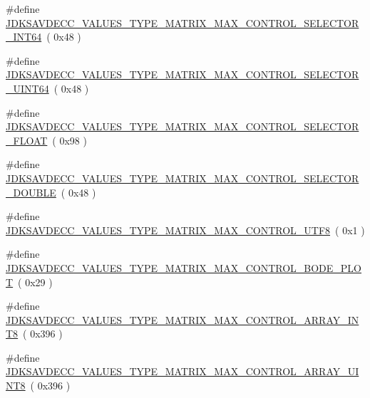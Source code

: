 \begin{DoxyCompactItemize}
\item 
\#define \hyperlink{group__values__type__matrix__max_ga6596fa809de5fad190036f0e50918e94}{J\+D\+K\+S\+A\+V\+D\+E\+C\+C\+\_\+\+V\+A\+L\+U\+E\+S\+\_\+\+T\+Y\+P\+E\+\_\+\+M\+A\+T\+R\+I\+X\+\_\+\+M\+A\+X\+\_\+\+C\+O\+N\+T\+R\+O\+L\+\_\+\+S\+E\+L\+E\+C\+T\+O\+R\+\_\+\+I\+N\+T64}~( 0x48 )
\item 
\#define \hyperlink{group__values__type__matrix__max_ga09d083e7ae4fb6c4ce96a770def60fd6}{J\+D\+K\+S\+A\+V\+D\+E\+C\+C\+\_\+\+V\+A\+L\+U\+E\+S\+\_\+\+T\+Y\+P\+E\+\_\+\+M\+A\+T\+R\+I\+X\+\_\+\+M\+A\+X\+\_\+\+C\+O\+N\+T\+R\+O\+L\+\_\+\+S\+E\+L\+E\+C\+T\+O\+R\+\_\+\+U\+I\+N\+T64}~( 0x48 )
\item 
\#define \hyperlink{group__values__type__matrix__max_ga8b3cf62275e948f85e546523ad140d28}{J\+D\+K\+S\+A\+V\+D\+E\+C\+C\+\_\+\+V\+A\+L\+U\+E\+S\+\_\+\+T\+Y\+P\+E\+\_\+\+M\+A\+T\+R\+I\+X\+\_\+\+M\+A\+X\+\_\+\+C\+O\+N\+T\+R\+O\+L\+\_\+\+S\+E\+L\+E\+C\+T\+O\+R\+\_\+\+F\+L\+O\+AT}~( 0x98 )
\item 
\#define \hyperlink{group__values__type__matrix__max_ga60a17f7db294a757053cca5126346baa}{J\+D\+K\+S\+A\+V\+D\+E\+C\+C\+\_\+\+V\+A\+L\+U\+E\+S\+\_\+\+T\+Y\+P\+E\+\_\+\+M\+A\+T\+R\+I\+X\+\_\+\+M\+A\+X\+\_\+\+C\+O\+N\+T\+R\+O\+L\+\_\+\+S\+E\+L\+E\+C\+T\+O\+R\+\_\+\+D\+O\+U\+B\+LE}~( 0x48 )
\item 
\#define \hyperlink{group__values__type__matrix__max_ga1f8b71e9bead1003c6cfabb3b3886884}{J\+D\+K\+S\+A\+V\+D\+E\+C\+C\+\_\+\+V\+A\+L\+U\+E\+S\+\_\+\+T\+Y\+P\+E\+\_\+\+M\+A\+T\+R\+I\+X\+\_\+\+M\+A\+X\+\_\+\+C\+O\+N\+T\+R\+O\+L\+\_\+\+U\+T\+F8}~( 0x1 )
\item 
\#define \hyperlink{group__values__type__matrix__max_ga99f66da4c2adf4ac92a11eaa89716294}{J\+D\+K\+S\+A\+V\+D\+E\+C\+C\+\_\+\+V\+A\+L\+U\+E\+S\+\_\+\+T\+Y\+P\+E\+\_\+\+M\+A\+T\+R\+I\+X\+\_\+\+M\+A\+X\+\_\+\+C\+O\+N\+T\+R\+O\+L\+\_\+\+B\+O\+D\+E\+\_\+\+P\+L\+OT}~( 0x29 )
\item 
\#define \hyperlink{group__values__type__matrix__max_gabb8ad2ca2c9ee24d58d6e5087d12f752}{J\+D\+K\+S\+A\+V\+D\+E\+C\+C\+\_\+\+V\+A\+L\+U\+E\+S\+\_\+\+T\+Y\+P\+E\+\_\+\+M\+A\+T\+R\+I\+X\+\_\+\+M\+A\+X\+\_\+\+C\+O\+N\+T\+R\+O\+L\+\_\+\+A\+R\+R\+A\+Y\+\_\+\+I\+N\+T8}~( 0x396 )
\item 
\#define \hyperlink{group__values__type__matrix__max_ga9aca1be479633219053be51fe4f087d3}{J\+D\+K\+S\+A\+V\+D\+E\+C\+C\+\_\+\+V\+A\+L\+U\+E\+S\+\_\+\+T\+Y\+P\+E\+\_\+\+M\+A\+T\+R\+I\+X\+\_\+\+M\+A\+X\+\_\+\+C\+O\+N\+T\+R\+O\+L\+\_\+\+A\+R\+R\+A\+Y\+\_\+\+U\+I\+N\+T8}~( 0x396 )
\item 

\end{DoxyCompactItemize}
